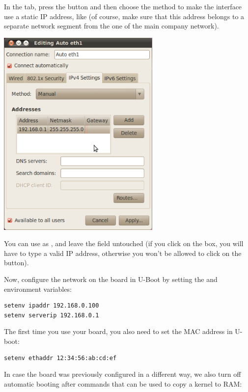 In the  tab, press the  button
and then choose the  method to make the interface use
a static IP address, like  (of course, make sure
that this address belongs to a separate network segment from the one
of the main company network).

\begin{center}
\includegraphics[width=8cm]{labs/sysdev-u-boot/network-config-3.png}
\end{center}

You can use  as , and leave the
 field untouched (if you click on the  box, you
will have to type a valid IP address, otherwise you won't be allowed to
click on the  button).

Now, configure the network on the board in U-Boot by setting the 
and  environment variables:

\begin{verbatim}
setenv ipaddr 192.168.0.100
setenv serverip 192.168.0.1
\end{verbatim}

The first time you use your board, you also need to set the MAC
address in U-boot:

\begin{verbatim}
setenv ethaddr 12:34:56:ab:cd:ef
\end{verbatim}

In case the board was previously configured in a different way, we
also turn off automatic booting after commands that can be used to
copy a kernel to RAM:

